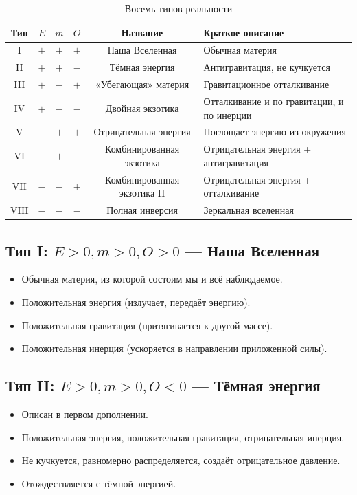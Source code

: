 \documentclass[12pt,a4paper]{article}
\begin{document}
\begin{table}[h]
    \centering
    \caption{Восемь типов реальности}
    \begin{tabular}{cccccl}
        \toprule
        Тип & $E$ & $m$ & $O$ & Название & Краткое описание \\
        \midrule
        I   & $+$ & $+$ & $+$ & Наша Вселенная & Обычная материя \\
        II  & $+$ & $+$ & $-$ & Тёмная энергия & Антигравитация, не кучкуется \\
        III & $+$ & $-$ & $+$ & «Убегающая» материя & Гравитационное отталкивание \\
        IV  & $+$ & $-$ & $-$ & Двойная экзотика & Отталкивание и по гравитации, и по инерции \\
        V   & $-$ & $+$ & $+$ & Отрицательная энергия & Поглощает энергию из окружения \\
        VI  & $-$ & $+$ & $-$ & Комбинированная экзотика & Отрицательная энергия + антигравитация \\
        VII & $-$ & $-$ & $+$ & Комбинированная экзотика II & Отрицательная энергия + отталкивание \\
        VIII& $-$ & $-$ & $-$ & Полная инверсия & Зеркальная вселенная \\
        \bottomrule
    \end{tabular}
    \label{tab:types}
\end{table}

\subsection{Тип I: $E > 0, m > 0, O > 0$ --- Наша Вселенная}
\begin{itemize}
    \item Обычная материя, из которой состоим мы и всё наблюдаемое.
    \item Положительная энергия (излучает, передаёт энергию).
    \item Положительная гравитация (притягивается к другой массе).
    \item Положительная инерция (ускоряется в направлении приложенной силы).
\end{itemize}

\subsection{Тип II: $E > 0, m > 0, O < 0$ --- Тёмная энергия}
\begin{itemize}
    \item Описан в первом дополнении.
    \item Положительная энергия, положительная гравитация, отрицательная инерция.
    \item Не кучкуется, равномерно распределяется, создаёт отрицательное давление.
    \item Отождествляется с тёмной энергией.
\end{itemize}
\end{document}
